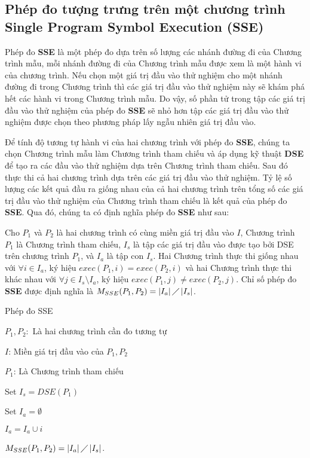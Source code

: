 \subsection{Phép đo tượng trưng trên một chương trình Single Program Symbol Execution (SSE)}
Phép đo \textbf{SSE} là một phép đo dựa trên số lượng các nhánh đường đi của Chương trình mẫu, mỗi nhánh đường đi của Chương trình mẫu được xem là một hành vi của chương trình. Nếu chọn một giá trị đầu vào thử nghiệm cho một nhánh đường đi trong Chương trình thì các giá trị đầu vào thử nghiệm này sẽ khám phá hết các hành vi trong Chương trình mẫu. Do vậy, số phần tử trong tập các giá trị đầu vào thử nghiệm của phép đo \textbf{SSE} sẽ nhỏ hơn tập các giá trị đầu vào thử nghiệm được chọn theo phương pháp lấy ngẫu nhiên giá trị đầu vào. 

Để tính độ tương tự hành vi của hai chương trình với phép đo \textbf{SSE}, chúng ta chọn Chương trình mẫu làm Chương trình tham chiếu và áp dụng kỹ thuật \textbf{DSE} để tạo ra các đầu vào thử nghiệm dựa trên Chương trình tham chiếu. Sau đó thực thi cả hai chương trình dựa trên các giá trị đầu vào thử nghiệm. Tỷ lệ số lượng các kết quả đầu ra giống nhau của cả hai chương trình trên tổng số các giá trị đầu vào thử nghiệm của Chương trình tham chiếu là kết quả của phép đo \textbf{SSE}. Qua đó, chúng ta có định nghĩa phép đo \textbf{SSE} như sau:

\begin{definition}
	Cho $P_{1}$ và $P_{2}$ là hai chương trình có cùng miền giá trị đầu vào $I$, Chương trình $P_{1}$ là Chương trình tham chiếu, $I_{s}$ là tập các giá trị đầu vào được tạo bởi DSE trên chương trình $P_{1}$, và $I_{a}$ là tập con $I_{s}$. Hai Chương trình thực thi giống nhau với $\forall i \in I_{a}$, ký hiệu $exec(P_{1}, i) = exec(P_{2}, i)$ và hai Chương trình thực thi khác nhau với $\forall j \in I_{s} \setminus I_{a}$, ký hiệu $exec(P_{1}, j) \neq exec(P_{2}, j)$. Chỉ số phép đo \textbf{SSE} được định nghĩa là $M_{SSE}(P_{1}, P_{2}) = \left|I_{a}\right| \diagup \left|I_{s}\right| $.
\end{definition}

\begin{algorithm}[H]
	\caption{Phép đo SSE}
	\begin{algorithmic}	
		\item $P_{1}, P_{2}:$ Là hai chương trình cần đo tương tự
		\item $I$: Miền giá trị đầu vào của $P_{1}, P_{2}$
		\item $P_{1}$: Là Chương trình tham chiếu
		\item Set $I_{s} = DSE(P_{1})$ 
		\item Set $I_{a} = \emptyset$ 
		  
		
		\State $I_{a} = I_{a} \cup i$		
		\EndIf
		\EndWhile
		\item $M_{SSE}(P_{1}, P_{2}) = \left|I_{a}\right| \diagup \left|I_{s}\right| $. 
	\end{algorithmic}
\end{algorithm}

